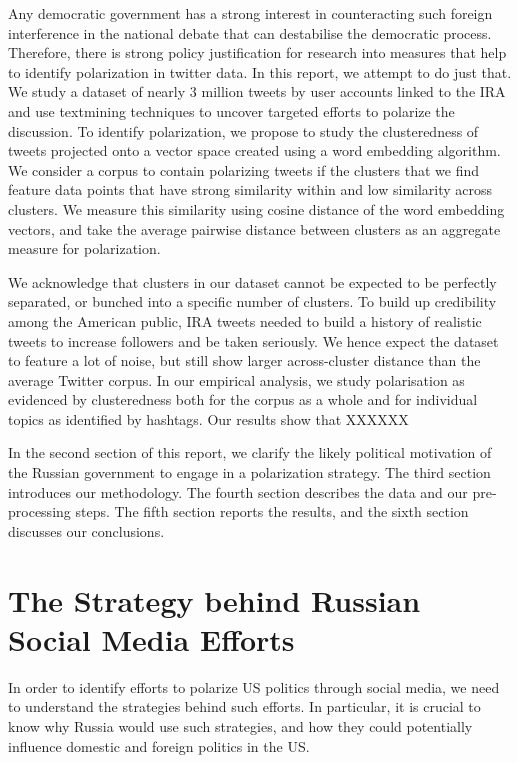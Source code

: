 \documentclass[12pt, authoryear]{elsarticle}
\begin{document}
Any democratic government has a strong interest in counteracting such foreign interference in the national debate that can destabilise the democratic process. Therefore, there is strong policy justification for research into measures that help to identify polarization in twitter data. In this report, we attempt to do just that. We study a dataset of nearly 3 million tweets by user accounts linked to the IRA and use textmining techniques to uncover targeted efforts to polarize the discussion. To identify polarization, we propose to study the clusteredness of tweets projected onto a vector space created using a word embedding algorithm. We consider a corpus to contain polarizing tweets if the clusters that we find feature data points that have strong similarity within and low similarity across clusters. We measure this similarity using cosine distance of the word embedding vectors, and take the average pairwise distance between clusters as an aggregate measure for polarization. 

We acknowledge that clusters in our dataset cannot be expected to be perfectly separated, or bunched into a specific number of clusters. To build up credibility among the American public, IRA tweets needed to build a history of realistic tweets to increase followers and be taken seriously. We hence expect the dataset to feature a lot of noise, but still show larger across-cluster distance than the average Twitter corpus. In our empirical analysis, we study polarisation as evidenced by clusteredness both for the corpus as a whole and for individual topics as identified by hashtags. Our results show that XXXXXX

In the second section of this report, we clarify the likely political motivation of the Russian government to engage in a polarization strategy. The third section introduces our methodology. The fourth section describes the data and our pre-processing steps. The fifth section reports the results, and the sixth section discusses our conclusions.

\section{The Strategy behind Russian Social Media Efforts}\label{literature}

In order to identify efforts to polarize US politics through social media, we need to understand the strategies behind such efforts. In particular, it is crucial to know why Russia would use such strategies, and how they could potentially influence domestic and foreign politics in the US. 
\end{document}
